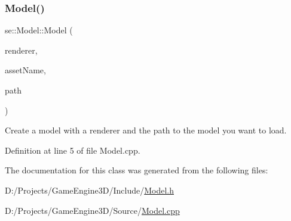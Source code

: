 \subsubsection{\texorpdfstring{Model()}{Model()}}
{\footnotesize\ttfamily se\+::\+Model\+::\+Model (\begin{DoxyParamCaption}\item[{\mbox{\hyperlink{classse_1_1_abstract_renderer}{Abstract\+Renderer}} $\ast$}]{renderer,  }\item[{const std\+::string \&}]{asset\+Name,  }\item[{const std\+::string \&}]{path }\end{DoxyParamCaption})}

Create a model with a renderer and the path to the model you want to load. 

Definition at line 5 of file Model.\+cpp.



The documentation for this class was generated from the following files\+:\begin{DoxyCompactItemize}
\item 
D\+:/\+Projects/\+Game\+Engine3\+D/\+Include/\mbox{\hyperlink{_model_8h}{Model.\+h}}\item 
D\+:/\+Projects/\+Game\+Engine3\+D/\+Source/\mbox{\hyperlink{_model_8cpp}{Model.\+cpp}}\end{DoxyCompactItemize}
